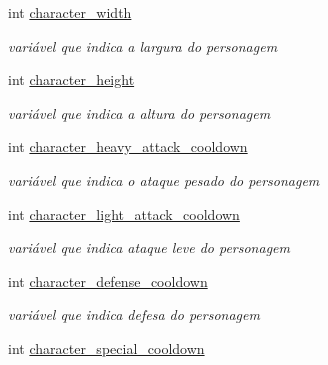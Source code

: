 \begin{DoxyCompactItemize}
int \mbox{\hyperlink{classCharacter_a8ede7c049b28ca40d1b35c0e14cc1c66}{character\+\_\+width}}
\begin{DoxyCompactList}\small\item\em variável que indica a largura do personagem \end{DoxyCompactList}\item 
\mbox{\label{classCharacter_a41926aae9cdfda3730ee7c1a334b0572}} 
int \mbox{\hyperlink{classCharacter_a41926aae9cdfda3730ee7c1a334b0572}{character\+\_\+height}}
\begin{DoxyCompactList}\small\item\em variável que indica a altura do personagem \end{DoxyCompactList}\item 
\mbox{\label{classCharacter_abf1d7cdaa318adeb9cee6edfe919cb8c}} 
int \mbox{\hyperlink{classCharacter_abf1d7cdaa318adeb9cee6edfe919cb8c}{character\+\_\+heavy\+\_\+attack\+\_\+cooldown}}
\begin{DoxyCompactList}\small\item\em variável que indica o ataque pesado do personagem \end{DoxyCompactList}\item 
\mbox{\label{classCharacter_a7b8e1c9ff525068d6f479b690af1ab09}} 
int \mbox{\hyperlink{classCharacter_a7b8e1c9ff525068d6f479b690af1ab09}{character\+\_\+light\+\_\+attack\+\_\+cooldown}}
\begin{DoxyCompactList}\small\item\em variável que indica ataque leve do personagem \end{DoxyCompactList}\item 
\mbox{\label{classCharacter_abab76567fdafbc8c185ff5d83d516e76}} 
int \mbox{\hyperlink{classCharacter_abab76567fdafbc8c185ff5d83d516e76}{character\+\_\+defense\+\_\+cooldown}}
\begin{DoxyCompactList}\small\item\em variável que indica defesa do personagem \end{DoxyCompactList}\item 
\mbox{\label{classCharacter_a9746df15f2ed60b63577055d0c77b534}} 
int \mbox{\hyperlink{classCharacter_a9746df15f2ed60b63577055d0c77b534}{character\+\_\+special\+\_\+cooldown}}

\end{DoxyCompactItemize}
